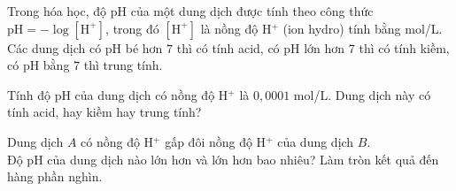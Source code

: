 \begin{bt}%
	Trong hóa học, độ  pH  của một dung dịch được tính theo công thức $\text{pH}=-\log[\text{H}^+] $, trong đó $ [\text{H}^+] $ là nồng độ  H$^+ $ (ion hydro) tính bằng mol/L. Các dung dịch có  pH  bé hơn $ 7 $ thì có tính acid, có pH  lớn hơn $ 7 $ thì có tính kiềm, có  pH  bằng $ 7 $ thì trung tính.
	\begin{listEX}[1]
		\item[a)] Tính độ  pH  của dung dịch có nồng độ H$^+ $ là $ 0{,}0001 $ mol/L. Dung dịch này có tính acid, hay kiềm hay trung tính?
		\item[b)] Dung dịch $ A $ có nồng độ  H$^+ $ gấp đôi nồng độ  H$^+ $ của dung dịch $ B $.\\
		Độ pH  của dung dịch nào lớn hơn và lớn hơn bao nhiêu? Làm tròn kết quả đến hàng phần nghìn.
	\end{listEX}
\end{bt}

